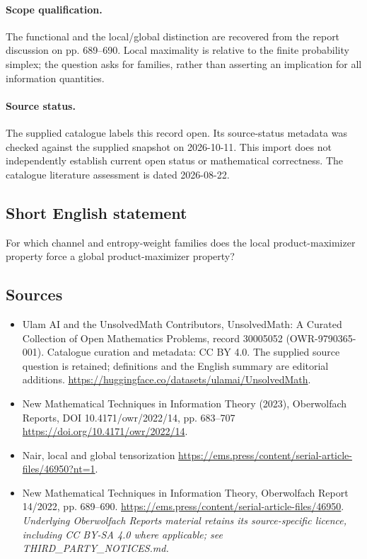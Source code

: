 \documentclass[11pt]{article}
\begin{document}
\paragraph{Scope qualification.}
The functional and the local/global distinction are recovered from the report discussion on pp. 689--690. Local maximality is relative to the finite probability simplex; the question asks for families, rather than asserting an implication for all information quantities.
\paragraph{Source status.}
The supplied catalogue labels this record open. Its source-status metadata was checked against the supplied snapshot on 2026-10-11. This import does not independently establish current open status or mathematical correctness. The catalogue literature assessment is dated 2026-08-22.
\subsection{Short English statement}
For which channel and entropy-weight families does the local product-maximizer property force a global product-maximizer property?
\subsection{Sources}
\begin{itemize}
\item[S1] Ulam AI and the UnsolvedMath Contributors, UnsolvedMath: A Curated Collection of Open Mathematics Problems, record 30005052 (OWR-9790365-001). Catalogue curation and metadata: CC BY 4.0. The supplied source question is retained; definitions and the English summary are editorial additions.
\url{https://huggingface.co/datasets/ulamai/UnsolvedMath}.
\item[S2] New Mathematical Techniques in Information Theory (2023), Oberwolfach Reports, DOI 10.4171/owr/2022/14, pp. 683--707
\url{https://doi.org/10.4171/owr/2022/14}.
\item[S3] Nair, local and global tensorization
\url{https://ems.press/content/serial-article-files/46950?nt=1}.
\item[S4] New Mathematical Techniques in Information Theory, Oberwolfach Report 14/2022, pp. 689--690.
\url{https://ems.press/content/serial-article-files/46950}.
\textit{Underlying Oberwolfach Reports material retains its source-specific licence, including CC BY-SA 4.0 where applicable; see THIRD\_PARTY\_NOTICES.md.}
\end{itemize}
\end{document}
